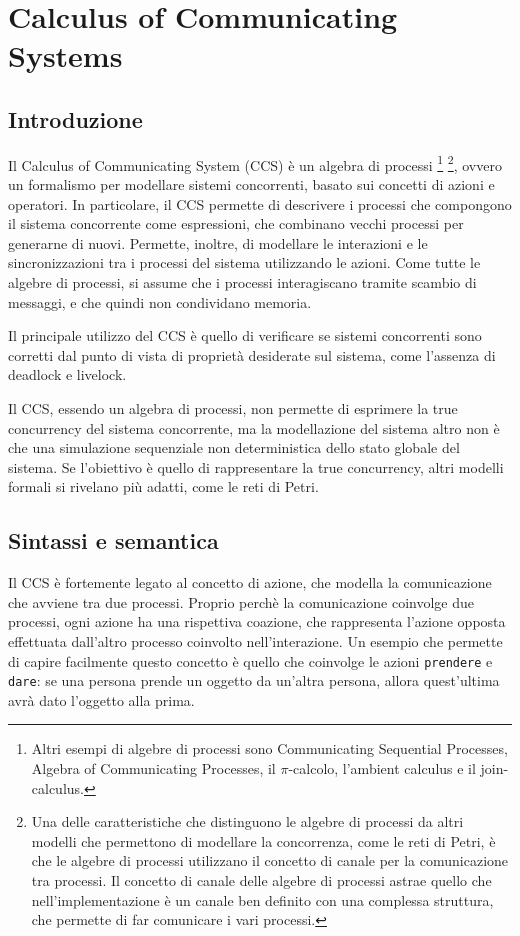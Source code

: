 \chapter{Calculus of Communicating Systems}
\section{Introduzione}
Il Calculus of Communicating System (CCS) è un algebra di processi
\footnote{Altri esempi di algebre di processi sono Communicating Sequential
Processes, Algebra of Communicating Processes, il $\pi$-calcolo, l'ambient
calculus e il join-calculus.}
\footnote{Una delle caratteristiche che distinguono le algebre di processi
da altri modelli che permettono di modellare la concorrenza, come le reti
di Petri, è che le algebre di processi utilizzano il concetto di canale
per la comunicazione tra processi. Il concetto di canale delle algebre di
processi astrae quello che nell'implementazione è un canale ben definito con
una complessa struttura, che permette di far comunicare i vari processi.},
ovvero un formalismo per modellare sistemi concorrenti,
basato sui concetti di azioni e operatori.
In particolare, il CCS permette di descrivere
i processi che compongono il sistema concorrente come espressioni, che combinano
vecchi processi per generarne di nuovi. Permette, inoltre, di modellare
le interazioni e le sincronizzazioni tra i processi del sistema utilizzando
le azioni.
Come tutte le algebre di processi, si assume che i processi interagiscano
tramite scambio di messaggi, e che quindi non condividano memoria.

Il principale utilizzo del CCS è quello di verificare se sistemi concorrenti
sono corretti dal punto di vista di proprietà desiderate sul sistema, come
l'assenza di deadlock e livelock.

Il CCS, essendo un algebra di processi, non permette di esprimere la true
concurrency del sistema concorrente, ma la modellazione del sistema altro non
è che una simulazione sequenziale non deterministica dello stato globale
del sistema.
Se l'obiettivo è quello di rappresentare la true concurrency, altri modelli
formali si rivelano più adatti, come le reti di Petri.

\section{Sintassi e semantica}
Il CCS è fortemente legato al concetto di azione, che modella la comunicazione
che avviene tra due processi. Proprio perchè la comunicazione coinvolge due
processi, ogni azione ha una rispettiva coazione, che rappresenta
l'azione opposta effettuata dall'altro processo coinvolto nell'interazione.
Un esempio che permette di capire facilmente questo concetto è quello
che coinvolge le azioni \verb|prendere| e \verb|dare|: se una persona
prende un oggetto da un'altra persona, allora quest'ultima avrà dato l'oggetto
alla prima.

